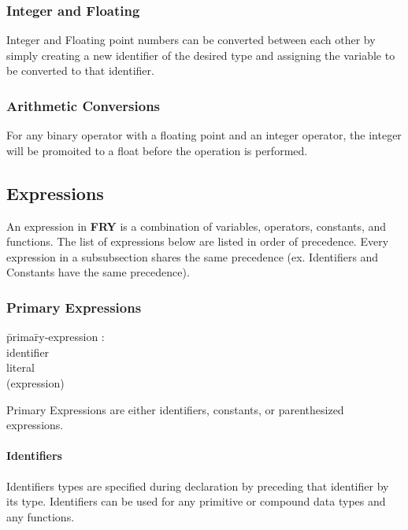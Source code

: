 \documentclass{article}
\begin{document}
\subsubsection{Integer and Floating}
Integer and Floating point numbers can be converted between each other by simply creating a new identifier of the desired type and assigning the variable to be converted to that identifier. 
\subsubsection{Arithmetic Conversions}
For any binary operator with a floating point and an integer operator, the integer will be promoited to a float before the operation is performed.

\subsection{Expressions}
\label{sec:expr}
An expression in \textbf{FRY} is a combination of variables, operators, constants, and functions. The list of expressions below are listed in order of precedence. Every expression in a subsubsection shares the same precedence (ex. Identifiers and Constants have the same precedence).
\subsubsection{Primary Expressions}
\begin{itshape}
\begin{tabbing}
	\= prima\=ry-expression : \\
		\>\> identifier \\
		\>\> literal \\ 
		\>\> (expression)
\end{tabbing}
\end{itshape}

Primary Expressions are either identifiers, constants, or parenthesized expressions. 
\paragraph{Identifiers}
Identifiers types are specified during declaration by preceding that identifier by its type.  Identifiers can be used for any primitive or compound data types and any functions. 
\end{document}
